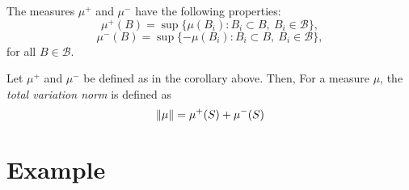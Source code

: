 The measures \( \mu^+ \) and \( \mu^- \) have the following properties:
\[
\mu^+(B) = \sup\{ \mu(B_i) : B_i \subset B,\ B_i \in \mathcal{B} \},
\]
\[
\mu^-(B) = \sup\{ -\mu(B_i) : B_i \subset B,\ B_i \in \mathcal{B} \},
\]
for all \( B \in \mathcal{B} \).

\begin{definition} \label{def:signed_meas}
  Let $\mu^+$ and $\mu^-$ be defined as in the corollary above. Then, For a measure \( \mu \), the \emph{total variation norm} is defined as
   \[\left\lVert \mu \right\rVert = \mu^{+}(S) + \mu^{-}(S)\] 
\end{definition}

\begin{comment}
  \begin{definition} \cite{tsybakov2008}
    Let  let $P$ and $Q$ be two probability measures on $\mathcal{M}\mathbb{R}$. Define
    $$
      \nu = P + Q, \quad p = \frac{dP}{d\nu}, \quad q = \frac{dQ}{d\nu},
    $$
    where $\frac{dP}{d\nu}$ denotes the  the Radon–Nikodym derivative of the measure $P$ with respect to the measure $\nu$. It holds that:
    \begin{align*}
      \norm{P-Q} = \sup_{A \in  \mathcal{B}} \left\{ \left\vert \int_{A} (p - q) \, d\nu \right\vert \right\}.
    \end{align*}
     \end{definition}
\end{comment}

 

  
\section{Example}

 

